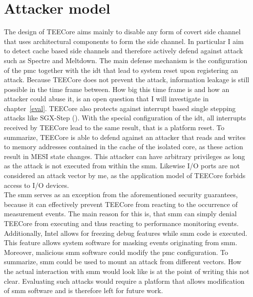\section{Attacker model}
The design of TEECore aims mainly to disable any form of covert side channel
that uses architectural components to form the side channel. In particular I aim
to detect cache based side channels and therefore actively defend against attack
such as Spectre and Meltdown. The main defense mechanism is the configuration of
the \gls{pmc} together with the \gls{idt} that lead to system reset upon
registering an attack. Because TEECore does not prevent the attack, information
leakage is still possible in the time frame between. How big this time frame is
and how an attacker could abuse it, is an open question that I will investigate
in chapter~\ref{eval}. TEECore also protects against
interrupt based single stepping attacks like SGX-Step (). With the special configuration of the \gls{idt}, all interrupts
received by TEECore lead to the same result, that is a platform reset. To
summarize, TEECore is able to defend against an attacker that reads and writes
to memory addresses contained in the cache of the isolated core, as these action
result in MESI state changes. This attacker can have arbitrary privileges as
long as the attack is not executed from within the \gls{smm}. Likewise I/O ports
are not considered an attack vector by me, as the application model of TEECore
forbids access to I/O devices. \\

The \gls{smm} serves as an exception from the aforementioned security
guarantees, because it can effectively prevent TEECore from reacting to the
occurrence of measurement events. The main reason for this is, that \gls{smm}
can simply denial TEECore from executing and thus reacting to performance
monitoring events. Additionally, Intel allows for freezing debug features while
\gls{smm} code is executed. This feature allows system software for masking
events originating from \gls{smm}.\cite{intel_sdm} Moreover, malicious \gls{smm}
software could modify the \gls{pmc} configuration. To summarize, \gls{smm} could
be used to mount an attack from different vectors. How the actual interaction
with \gls{smm} would look like is at the point of writing this not clear.
Evaluating such attacks would require a platform that allows modification of
\gls{smm} software and is therefore left for future work. \\

